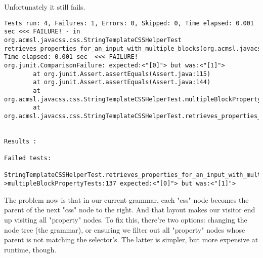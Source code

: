 \documentclass[11pt]{article}
\begin{document}
Unfortunately it still fails.

\begin{verbatim}
Tests run: 4, Failures: 1, Errors: 0, Skipped: 0, Time elapsed: 0.001 sec <<< FAILURE! - in org.acmsl.javacss.css.StringTemplateCSSHelperTest
retrieves_properties_for_an_input_with_multiple_blocks(org.acmsl.javacss.css.StringTemplateCSSHelperTest)  Time elapsed: 0.001 sec  <<< FAILURE!
org.junit.ComparisonFailure: expected:<"[0]"> but was:<"[1]">
        at org.junit.Assert.assertEquals(Assert.java:115)
        at org.junit.Assert.assertEquals(Assert.java:144)
        at org.acmsl.javacss.css.StringTemplateCSSHelperTest.multipleBlockPropertyTests(StringTemplateCSSHelperTest.java:137)
        at org.acmsl.javacss.css.StringTemplateCSSHelperTest.retrieves_properties_for_an_input_with_multiple_blocks(StringTemplateCSSHelperTest.java:151)


Results :

Failed tests:
  StringTemplateCSSHelperTest.retrieves_properties_for_an_input_with_multiple_blocks:151->multipleBlockPropertyTests:137 expected:<"[0]"> but was:<"[1]">
\end{verbatim}

The problem now is that in our current grammar, each "css" node becomes the parent of the next "css" node to the right. And that
layout makes our visitor end up visiting all "property" nodes. To fix this, there're two options: changing the node tree (the grammar), or
ensuring we filter out all "property" nodes whose parent is not matching the selector's. The latter is simpler, but more
expensive at runtime, though.
\end{document}
